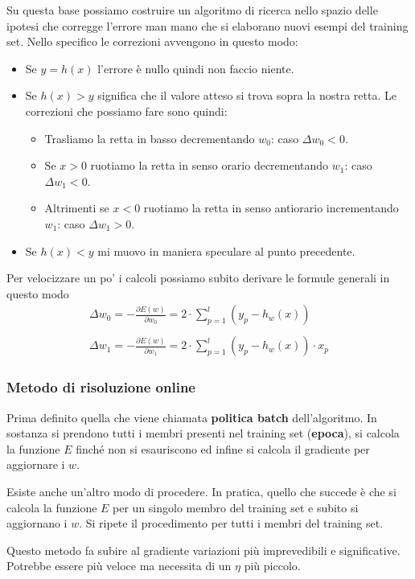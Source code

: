 Su questa base possiamo costruire un algoritmo di ricerca nello spazio delle ipotesi che corregge l'errore man mano che
si elaborano nuovi esempi del training set. Nello specifico le correzioni avvengono in questo modo:
\begin{itemize}
	\item Se $y = h(x)$ l'errore \`e nullo quindi non faccio niente.
	\item Se $h(x) > y$ significa che il valore atteso si trova sopra la nostra retta. Le correzioni che possiamo fare
	      sono quindi:
	      \begin{itemize}
		      \item Trasliamo la retta in basso decrementando $w_0$: caso $\Delta w_0 < 0$.
		      \item Se $x > 0$ ruotiamo la retta in senso orario decrementando $w_1$: caso $\Delta w_1 < 0$.
		      \item Altrimenti se $x < 0$ ruotiamo la retta in senso antiorario incrementando $w_1$: caso $\Delta w_1 > 0$.
	      \end{itemize}
	\item Se $h(x) < y$ mi muovo in maniera speculare al punto precedente.
\end{itemize}
Per velocizzare un po' i calcoli possiamo subito derivare le formule generali in questo modo
\begin{gather*}
	\Delta w_0 = -\frac{\partial E(w)}{\partial w_0} = 2 \cdot \sum_{p=1}^l (y_p - h_w(x)) \\
	\\
	\Delta w_1 = -\frac{\partial E(w)}{\partial w_1} = 2 \cdot \sum_{p=1}^l (y_p - h_w(x)) \cdot x_p
\end{gather*}


\subsubsection{Metodo di risoluzione online}
Prima definito quella che viene chiamata \textbf{politica batch} dell'algoritmo. In sostanza si prendono tutti i membri
presenti nel training set (\textbf{epoca}), si calcola la funzione $E$ finch\'e non si esauriscono ed infine si calcola
il gradiente per aggiornare i $w$.

Esiste anche un'altro modo di procedere. In pratica, quello che succede \`e che si calcola la funzione $E$ per un singolo
membro del training set e subito si aggiornano i $w$. Si ripete il procedimento per tutti i membri del training set.

Questo metodo fa subire al gradiente variazioni pi\`u imprevedibili e significative. Potrebbe essere pi\`u veloce ma
necessita di un $\eta$ pi\`u piccolo.
